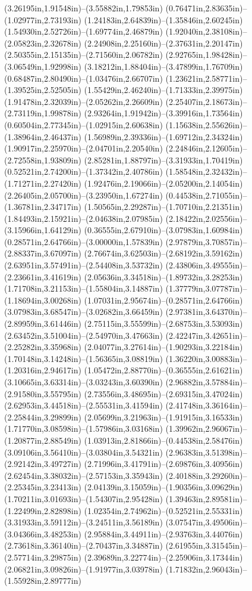 (3.26195in,1.91548in)--(3.55882in,1.79853in) (0.76471in,2.83635in)--(1.02977in,2.73193in) (1.24183in,2.64839in)--(1.35846in,2.60245in) (1.54930in,2.52726in)--(1.69774in,2.46879in) (1.92040in,2.38108in)--(2.05823in,2.32678in) (2.24908in,2.25160in)--(2.37631in,2.20147in) (2.50355in,2.15135in)--(2.71560in,2.06782in) (2.92765in,1.98428in)--(3.06549in,1.92998in) (3.18212in,1.88404in)--(3.47899in,1.76709in) (0.68487in,2.80490in)--(1.03476in,2.66707in) (1.23621in,2.58771in)--(1.39525in,2.52505in) (1.55429in,2.46240in)--(1.71333in,2.39975in) (1.91478in,2.32039in)--(2.05262in,2.26609in) (2.25407in,2.18673in)--(2.73119in,1.99878in) (2.93264in,1.91942in)--(3.39916in,1.73564in) (0.60504in,2.77345in)--(1.02915in,2.60638in) (1.15638in,2.55626in)--(1.38964in,2.46437in) (1.56989in,2.39336in)--(1.69712in,2.34324in) (1.90917in,2.25970in)--(2.04701in,2.20540in) (2.24846in,2.12605in)--(2.72558in,1.93809in) (2.85281in,1.88797in)--(3.31933in,1.70419in) (0.52521in,2.74200in)--(1.37342in,2.40786in) (1.58548in,2.32432in)--(1.71271in,2.27420in) (1.92476in,2.19066in)--(2.05200in,2.14054in) (2.26405in,2.05700in)--(3.23950in,1.67274in) (0.44538in,2.71055in)--(1.36781in,2.34717in) (1.50565in,2.29287in)--(1.70710in,2.21351in) (1.84493in,2.15921in)--(2.04638in,2.07985in) (2.18422in,2.02556in)--(3.15966in,1.64129in) (0.36555in,2.67910in)--(3.07983in,1.60984in) (0.28571in,2.64766in)--(3.00000in,1.57839in) (2.97879in,3.70857in)--(2.88337in,3.67097in) (2.76674in,3.62503in)--(2.68192in,3.59162in) (2.63951in,3.57491in)--(2.54408in,3.53732in) (2.43806in,3.49555in)--(2.23661in,3.41619in) (2.05636in,3.34518in)--(1.89732in,3.28253in) (1.71708in,3.21153in)--(1.55804in,3.14887in) (1.37779in,3.07787in)--(1.18694in,3.00268in) (1.07031in,2.95674in)--(0.28571in,2.64766in) (3.07983in,3.68547in)--(3.02682in,3.66459in) (2.97381in,3.64370in)--(2.89959in,3.61446in) (2.75115in,3.55599in)--(2.68753in,3.53093in) (2.63452in,3.51004in)--(2.54970in,3.47663in) (2.42247in,3.42651in)--(2.25282in,3.35968in) (2.04077in,3.27614in)--(1.90293in,3.22184in) (1.70148in,3.14248in)--(1.56365in,3.08819in) (1.36220in,3.00883in)--(1.20316in,2.94617in) (1.05472in,2.88770in)--(0.36555in,2.61621in) (3.10665in,3.63314in)--(3.03243in,3.60390in) (2.96882in,3.57884in)--(2.91580in,3.55795in) (2.73556in,3.48695in)--(2.69315in,3.47024in) (2.62953in,3.44518in)--(2.55531in,3.41594in) (2.41748in,3.36164in)--(2.25844in,3.29899in) (2.05699in,3.21963in)--(1.91915in,3.16533in) (1.71770in,3.08598in)--(1.57986in,3.03168in) (1.39962in,2.96067in)--(1.20877in,2.88549in) (1.03913in,2.81866in)--(0.44538in,2.58476in) (3.09106in,3.56410in)--(3.03804in,3.54321in) (2.96383in,3.51398in)--(2.92142in,3.49727in) (2.71996in,3.41791in)--(2.69876in,3.40956in) (2.62454in,3.38032in)--(2.57153in,3.35943in) (2.40188in,3.29260in)--(2.25345in,3.23413in) (2.04139in,3.15059in)--(1.90356in,3.09629in) (1.70211in,3.01693in)--(1.54307in,2.95428in) (1.39463in,2.89581in)--(1.22499in,2.82898in) (1.02354in,2.74962in)--(0.52521in,2.55331in) (3.31933in,3.59112in)--(3.24511in,3.56189in) (3.07547in,3.49506in)--(3.04366in,3.48253in) (2.95884in,3.44911in)--(2.93763in,3.44076in) (2.73618in,3.36140in)--(2.70437in,3.34887in) (2.61955in,3.31545in)--(2.57714in,3.29875in) (2.39689in,3.22774in)--(2.25906in,3.17344in) (2.06821in,3.09826in)--(1.91977in,3.03978in) (1.71832in,2.96043in)--(1.55928in,2.89777in) 